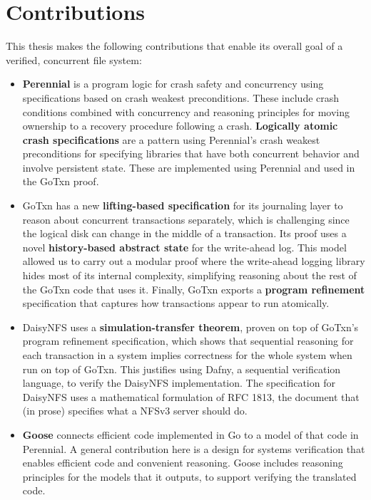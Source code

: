 \resume

\section{Contributions}
\label{sec:intro:contributions}

This thesis makes the following contributions that enable its overall goal of a
verified, concurrent file system:

\begin{itemize}
  \item \textbf{Perennial} is a program logic for crash safety
        and concurrency using specifications based on crash weakest
        preconditions. These include crash conditions combined with concurrency
        and reasoning principles for moving ownership to a recovery procedure
        following a crash. \textbf{Logically atomic crash specifications} are a
        pattern using Perennial's crash weakest preconditions for specifying
        libraries that have both concurrent behavior and involve persistent
        state. These are implemented using Perennial and used in the GoTxn
        proof.
  \item GoTxn has a new \textbf{lifting-based specification} for its journaling
        layer to reason about concurrent transactions separately, which is
        challenging since the logical disk can change in the middle of a transaction. Its proof uses a novel
        \textbf{history-based abstract state} for the write-ahead log. This model allowed us to carry
        out a modular proof where the write-ahead logging library hides most of
        its internal complexity, simplifying reasoning about the rest of the GoTxn
        code that uses it. Finally, GoTxn exports a \textbf{program refinement}
        specification that captures how transactions appear to run atomically.
  \item DaisyNFS uses a \textbf{simulation-transfer theorem}, proven on top of
        GoTxn's program refinement specification, which shows that sequential
        reasoning for each transaction in a system implies correctness for the
        whole system when run on top of GoTxn. This justifies using Dafny, a
        sequential verification language, to verify the DaisyNFS implementation.
        The specification for DaisyNFS uses a mathematical formulation of RFC
        1813, the document that (in prose) specifies what a NFSv3 server should
        do.
  \item \textbf{Goose} connects efficient code implemented in Go to a model of
        that code in Perennial. A general contribution here is a design for
        systems verification that enables efficient code and convenient
        reasoning. Goose includes reasoning principles for the models that it
        outputs, to support verifying the translated code.
\end{itemize}

